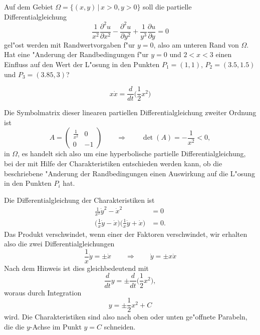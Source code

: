 Auf dem Gebiet $\Omega = \{(x,y)\,|\, x>0,y>0\}$ soll die partielle
Differentialgleichung
\begin{equation}
\frac1{x^2}\frac{\partial^2u}{\partial x^2}
-\frac{\partial^2 u}{\partial y^2}+\frac1{y^3}\frac{\partial u}{\partial y}=0
\label{90000012:equation}
\end{equation}
gel"ost werden mit Randwertvorgaben f"ur $y=0$, also am unteren Rand von
$\Omega$.
Hat eine "Anderung der Randbedingungen f"ur $y=0$ und $2<x<3$ einen Einfluss
auf den Wert der L"osung in den Punkten 
$P_1=(1,1)$, $P_2=(3.5,1.5)$ und $P_3=(3.85,3)$?

\begin{hinweis}
\[
x\dot x=\frac{d}{dt}\bigl(
{\textstyle \frac12}x^2
\bigr)
\]
\end{hinweis}

\begin{loesung}
Die Symbolmatrix dieser linearen partiellen Differentialgleichung zweiter
Ordnung ist
\[
A=\begin{pmatrix}
\frac1{x^2}&0\\0&-1
\end{pmatrix}
\qquad
\Rightarrow
\qquad
\det(A)=-\frac1{x^2}<0,
\]
in $\Omega$, es handelt sich also um eine hyperbolische partielle 
Differentialgleichung, bei der mit Hilfe der Charakteristiken
entschieden werden kann, ob die beschriebene "Anderung der Randbedingungen
einen Auswirkung auf die L"osung in den Punkten $P_i$ hat.

Die Differentialgleichung der Charakteristiken ist
\begin{align*}
\frac1{x^2}\dot y^2-\dot x^2&=0
\\
\biggl(\frac1x \dot y-\dot x\biggr)
\biggl(\frac1x \dot y+\dot x\biggr)
&=0.
\end{align*}
Das Produkt verschwindet, wenn einer der Faktoren verschwindet, wir erhalten
also die zwei Differentialgleichungen
\[
\frac1x\dot y=\pm\dot x
\qquad
\Rightarrow
\qquad
\dot y=\pm x\dot x
\]
Nach dem Hinweis ist dies gleichbedeutend mit
\[
\frac{d}{dt}y
=
\pm
\frac{d}{dt}
\biggl(
\frac12
x^2
\biggr),
\]
woraus durch Integration 
\[
y=\pm\frac12x^2+C
\]
wird.
Die Charakteristiken sind also nach oben oder unten ge"offnete Parabeln,
die die $y$-Achse im Punkt $y=C$ schneiden.


\end{loesung}
